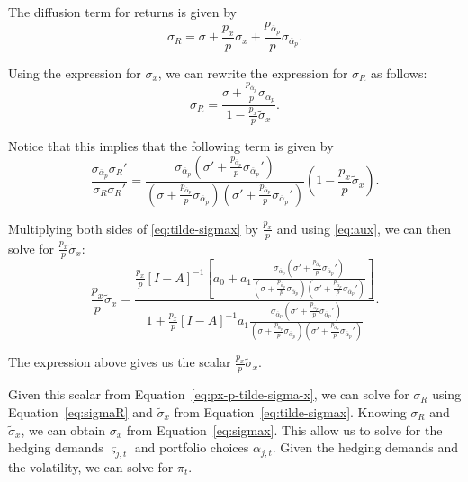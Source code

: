 \documentclass[12pt,english]{article}
\begin{document}
The diffusion term for returns is given by
\begin{equation}
	\sigma_R = \sigma + \frac{p_x}{p} \sigma_x + \frac{p_{\overline{\alpha}_p}}{p} \sigma_{\overline{\alpha}_p}.
\end{equation}

Using the expression for $\sigma_{x}$, we can rewrite the expression for $ \sigma_R $ as follows:
\begin{equation}\label{eq:sigmaR}
	\sigma_{R} = \frac{\sigma + \frac{p_{\overline{\alpha}_p}}{p} \sigma_{\overline{\alpha}_p}}{1-\frac{p_x}{p} \widetilde{\sigma}_x}. 
\end{equation}

Notice that this implies that the following term is given by
\begin{equation}\label{eq:aux}
	\frac{\sigma_{\overline{\alpha}_p} \sigma_{R}'}{\sigma_{R}\sigma_{R}'} = 
	\frac{\sigma_{\overline{\alpha}_p}\left(\sigma' + \frac{p_{\overline{\alpha}_p}}{p} \sigma_{\overline{\alpha}_p}'\right)}{\left(\sigma + \frac{p_{\overline{\alpha}_p}}{p} \sigma_{\overline{\alpha}_p}\right)\left(\sigma' + \frac{p_{\overline{\alpha}_p}}{p} \sigma_{\overline{\alpha}_p}'\right)} \left( 1-\frac{p_x}{p} \widetilde{\sigma}_x \right).
\end{equation}

Multiplying both sides of \eqref{eq:tilde-sigmax} by $ \frac{p_x}{p} $ and using \eqref{eq:aux}, we can then solve for $\frac{p_x}{p} \widetilde{\sigma}_x$:
\begin{equation}\label{eq:px-p-tilde-sigma-x}
	\frac{p_x}{p} \widetilde{\sigma}_x = \frac{\frac{p_x}{p} [I-A]^{-1} \left[a_0+a_1 \frac{\sigma_{\overline{\alpha}_p}\left(\sigma' + \frac{p_{\overline{\alpha}_p}}{p} \sigma_{\overline{\alpha}_p}'\right)}{\left(\sigma + \frac{p_{\overline{\alpha}_p}}{p} \sigma_{\overline{\alpha}_p}\right)\left(\sigma' + \frac{p_{\overline{\alpha}_p}}{p} \sigma_{\overline{\alpha}_p}'\right)}\right]}{1+\frac{p_x}{p} [I-A]^{-1} a_1 \frac{\sigma_{\overline{\alpha}_p}\left(\sigma' + \frac{p_{\overline{\alpha}_p}}{p} \sigma_{\overline{\alpha}_p}'\right)}{\left(\sigma + \frac{p_{\overline{\alpha}_p}}{p} \sigma_{\overline{\alpha}_p}\right)\left(\sigma' + \frac{p_{\overline{\alpha}_p}}{p} \sigma_{\overline{\alpha}_p}'\right)} }.
\end{equation}

The expression above gives us the scalar $\frac{p_x}{p} \widetilde{\sigma}_x$. 

Given this scalar from Equation~\eqref{eq:px-p-tilde-sigma-x}, we can solve for $\sigma_R$ using Equation~\eqref{eq:sigmaR} and $\widetilde{\sigma}_x$ from Equation~\eqref{eq:tilde-sigmax}. Knowing $ \sigma_R $ and $ \widetilde{\sigma}_x $, we can obtain $\sigma_x$ from Equation~\eqref{eq:sigmax}. This allow us to solve for the hedging demands $\varsigma_{j,t}$ and portfolio choices $\alpha_{j,t}$. Given the hedging demands and the volatility, we can solve for $\pi_t$.
\end{document}
